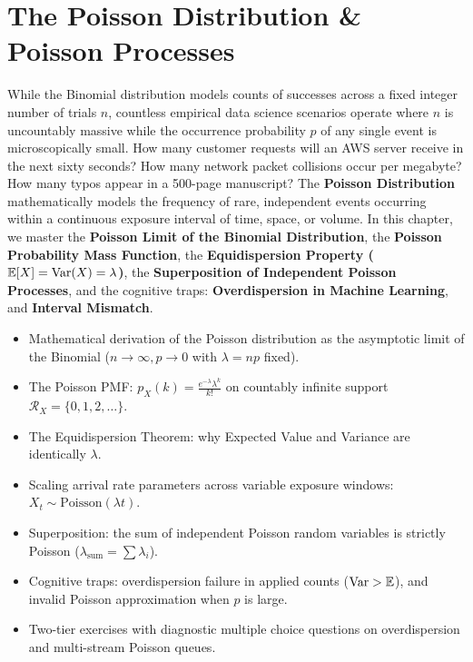 \chapter{The Poisson Distribution \& Poisson Processes}

While the Binomial distribution models counts of successes across a fixed integer number of trials $n$, countless empirical data science scenarios operate where $n$ is uncountably massive while the occurrence probability $p$ of any single event is microscopically small. How many customer requests will an AWS server receive in the next sixty seconds? How many network packet collisions occur per megabyte? How many typos appear in a 500-page manuscript? The \textbf{Poisson Distribution} mathematically models the frequency of rare, independent events occurring within a continuous exposure interval of time, space, or volume. In this chapter, we master the \textbf{Poisson Limit of the Binomial Distribution}, the \textbf{Poisson Probability Mass Function}, the \textbf{Equidispersion Property ($\mathbb{E}[X] = \operatorname{Var}(X) = \lambda$)}, the \textbf{Superposition of Independent Poisson Processes}, and the cognitive traps: \textbf{Overdispersion in Machine Learning}, and \textbf{Interval Mismatch}.

\vspace{0.5cm}
\begin{tcolorbox}[colback=primarylight, colframe=primarydark, title={\textbf{What You'll Learn in this Chapter}}]
\begin{itemize}
    \item Mathematical derivation of the Poisson distribution as the asymptotic limit of the Binomial ($n \to \infty, p \to 0$ with $\lambda = np$ fixed).
    \item The Poisson PMF: $p_X(k) = \frac{e^{-\lambda}\lambda^k}{k!}$ on countably infinite support $\mathcal{R}_X = \{0, 1, 2, \dots\}$.
    \item The Equidispersion Theorem: why Expected Value and Variance are identically $\lambda$.
    \item Scaling arrival rate parameters across variable exposure windows: $X_t \sim \text{Poisson}(\lambda t)$.
    \item Superposition: the sum of independent Poisson random variables is strictly Poisson ($\lambda_{\text{sum}} = \sum \lambda_i$).
    \item Cognitive traps: overdispersion failure in applied counts ($\operatorname{Var} > \mathbb{E}$), and invalid Poisson approximation when $p$ is large.
    \item Two-tier exercises with diagnostic multiple choice questions on overdispersion and multi-stream Poisson queues.
\end{itemize}
\end{tcolorbox}

